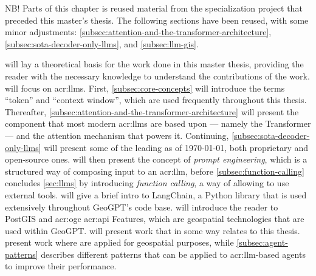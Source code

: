 \begin{itshape}
    NB! Parts of this chapter is reused material from the specialization project \citep{holmLLMsDeathGIS2023} that preceded this master's thesis. The following sections have been reused, with some minor adjustments: \autoref{subsec:attention-and-the-transformer-architecture}, \autoref{subsec:sota-decoder-only-llms}, and \autoref{subsec:llm-gis}.

\end{itshape}

\vspace{12pt}

\noindent {} will lay a theoretical basis for the work done in this master thesis, providing the reader with the necessary knowledge to understand the contributions of the work.  will focus on \glspl{acr:llm}. First, \autoref{subsec:core-concepts} will introduce the terms \enquote{token} and \enquote{context window}, which are used frequently throughout this thesis. Thereafter, \autoref{subsec:attention-and-the-transformer-architecture} will present the component that most modern \glspl{acr:llm} are based upon --- namely the Transformer --- and the attention mechanism that powers it. Continuing, \autoref{subsec:sota-decoder-only-llms} will present some of the leading  as of \today, both proprietary and open-source ones.  will then present the concept of \textit{prompt engineering}, which is a structured way of composing input to an \acrshort{acr:llm}, before \autoref{subsec:function-calling} concludes \autoref{sec:llms} by introducing \textit{function calling}, a way of allowing  to use external tools.  will give a brief intro to LangChain, a Python library that is used extensively throughout GeoGPT's code base.  will introduce the reader to PostGIS and \acrshort{acr:ogc} \acrshort{acr:api} Features, which are geospatial technologies that are used within GeoGPT.  will present work that in some way relates to this thesis.  present work where  are applied for geospatial purposes, while \autoref{subsec:agent-patterns} describes different patterns that can be applied to \acrshort{acr:llm}-based agents to improve their performance.


